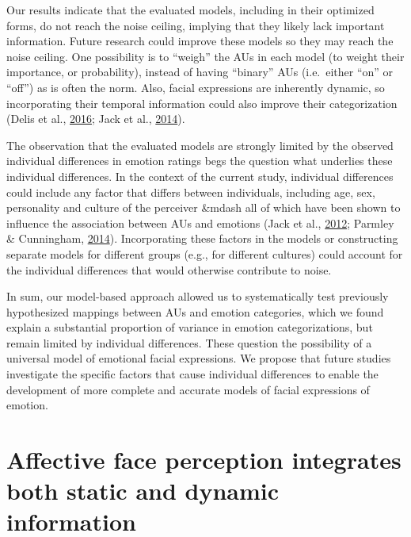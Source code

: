\documentclass[11pt,american,a4paper,oneside,]{memoir} %
\begin{document}
Our results indicate that the evaluated models, including in their optimized forms, do not reach the noise ceiling, implying that they likely lack important information. Future research could improve these models so they may reach the noise ceiling. One possibility is to ``weigh'' the AUs in each model (to weight their importance, or probability), instead of having ``binary'' AUs (i.e.~either ``on'' or ``off'') as is often the norm. Also, facial expressions are inherently dynamic, so incorporating their temporal information could also improve their categorization (Delis et al., \protect\hyperlink{ref-Delis2016-zl}{2016}; Jack et al., \protect\hyperlink{ref-Jack2014-ku}{2014}).

The observation that the evaluated models are strongly limited by the observed individual differences in emotion ratings begs the question what underlies these individual differences. In the context of the current study, individual differences could include any factor that differs between individuals, including age, sex, personality and culture of the perceiver \&mdash all of which have been shown to influence the association between AUs and emotions (Jack et al., \protect\hyperlink{ref-Jack2012-eq}{2012}; Parmley \& Cunningham, \protect\hyperlink{ref-Parmley2014-nj}{2014}). Incorporating these factors in the models or constructing separate models for different groups (e.g., for different cultures) could account for the individual differences that would otherwise contribute to noise.

In sum, our model-based approach allowed us to systematically test previously hypothesized mappings between AUs and emotion categories, which we found explain a substantial proportion of variance in emotion categorizations, but remain limited by individual differences. These question the possibility of a universal model of emotional facial expressions. We propose that future studies investigate the specific factors that cause individual differences to enable the development of more complete and accurate models of facial expressions of emotion.

\hypertarget{static-vs-dynamic}{%
\chapter{Affective face perception integrates both static and dynamic information}\label{static-vs-dynamic}}


\vspace*{\fill}
\end{document}

